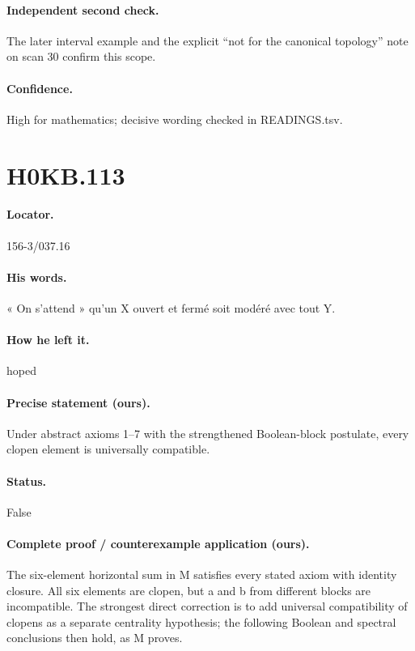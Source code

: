 \paragraph{Independent second check.} The later interval example and the explicit “not for the canonical topology” note on scan 30 confirm this scope.

\paragraph{Confidence.} High for mathematics; decisive wording checked in READINGS.tsv.

\section*{H0KB.113}\label{statement:H0KB.113}
\paragraph{Locator.} 156-3/037.16

\paragraph{His words.} « On s’attend » qu’un X ouvert et fermé soit modéré avec tout Y.

\paragraph{How he left it.} hoped

\paragraph{Precise statement (ours).} Under abstract axioms 1–7 with the strengthened Boolean-block postulate, every clopen element is universally compatible.

\paragraph{Status.} False

\paragraph{Complete proof / counterexample application (ours).} The six-element horizontal sum in M satisfies every stated axiom with identity closure. All six elements are clopen, but a and b from different blocks are incompatible. The strongest direct correction is to add universal compatibility of clopens as a separate centrality hypothesis; the following Boolean and spectral conclusions then hold, as M proves.

